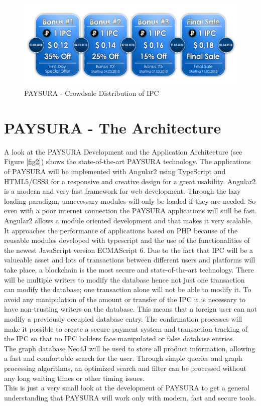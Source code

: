 \documentclass[twoside,onecolumn]{article}
\begin{document}
\begin{figure}[ht]
\centering
\includegraphics[scale=0.45]{crowdsale.png}
\caption{PAYSURA - Crowdsale Distribution of IPC}
\label{dg1}
\end{figure}
\clearpage



\section{PAYSURA - The Architecture}

A look at the PAYSURA Development and the Application Architecture (see Figure \ref{fig2}) shows the state-of-the-art PAYSURA technology. The applications of PAYSURA will be implemented with Angular2 using TypeScript and HTML5/CSS3 for a responsive and creative design for a great usability. Angular2 is a modern and very fast framework for web development. Through the lazy loading paradigm, unnecessary modules will only be loaded if they are needed. So even with a poor internet connection the PAYSURA applications will still be fast. 
Angular2 allows a module oriented development and that makes it very scalable. It approaches the performance of applications based on PHP because of the reusable modules developed with typescript and the use of the functionalities of the newest JavaScript version ECMAScript 6. 
\newline Due to the fact that IPC will be a valueable asset and lots of transactions between different users and platforms will take place, a blockchain is the most secure and state-of-the-art technology. There will be multiple writers to modify the database hence not just one transaction can modify the database; one transaction alone will not be able to modify it. To avoid any manipulation of the amount or transfer of the IPC it is necessary to have non-trusting writers on the database. This means that a foreign user can not modify a previously occupied database entry. The confirmation processes will make it possible to create a secure payment system and transaction tracking of the IPC so that no IPC holders face manipulated or false database entries.\\
The graph database Neo4J will be used to store all product information, allowing a fast and comfortable search for the user. Through simple queries and graph processing algorithms, an optimized search and filter can be processed without any long waiting times or other timing issues.\\
This is just a very small look at the development of PAYSURA to get a general understanding that PAYSURA will work only with modern, fast and secure tools.
\end{document}
